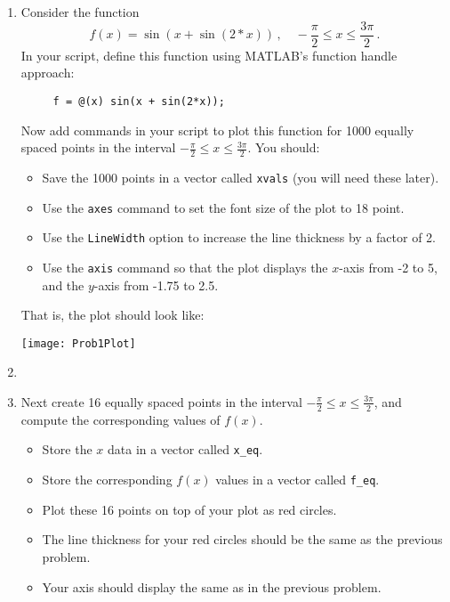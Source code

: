 \documentclass[12pt]{article}
\begin{document}
\begin{enumerate}
\item 
Consider the function 
$$
   f(x) = \sin(x+\sin(2*x))\,, \quad -\frac{\pi}{2} \leq x \leq \frac{3\pi}{2}\,.
$$
In your script, define this function using MATLAB's function handle approach:
\begin{verbatim}
     f = @(x) sin(x + sin(2*x));
\end{verbatim}
Now add commands in your script to plot this function for 1000 equally spaced points in the interval $-\frac{\pi}{2} \leq x \leq \frac{3\pi}{2}$.
You should:
\begin{itemize}
\item
Save the 1000 points in a vector called {\tt xvals} (you will need these later).
\item 
Use the {\tt axes} command to set the font size of the plot to 18 point.
\item
Use the {\tt LineWidth} option to increase the line thickness by a factor of 2.
\item
Use the {\tt axis} command so that the plot displays the $x$-axis from -2 to 5, and the $y$-axis from -1.75 to 2.5.
\end{itemize}
That is, the plot should look like:
\begin{center}
\texttt{[image: Prob1Plot]}
\end{center}
\item[]
\item
Next create 16 equally spaced points in the interval $-\frac{\pi}{2} \leq x \leq \frac{3\pi}{2}$, and compute the
corresponding values of $f(x)$.  
\begin{itemize}
\item
Store the $x$ data in a vector called {\tt x\_eq}.
\item
Store the  
corresponding $f(x)$ values in a vector called {\tt f\_eq}. 
\item
Plot these 16 points on top of your plot as red circles.
\item
The line thickness for your red circles should be the same as the previous problem.
\item
Your axis should display the same as in the previous problem.
\end{itemize}


\end{enumerate}
\end{document}
